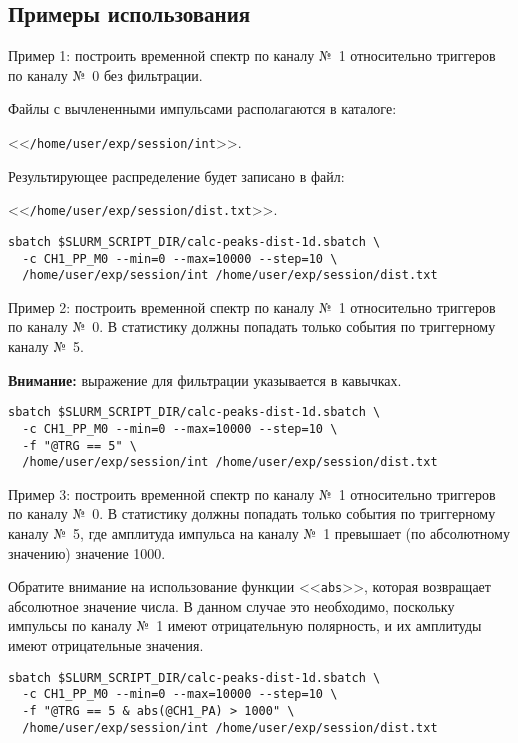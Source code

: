 \documentclass[12pt, a4paper, oneside, onecolumn]{book}
\newcommand{\DIRECTORY}[1]{<<{\tt #1}>>}
\newcommand{\FILE}[1]{<<{\tt #1}>>}
\newcommand{\NOTE}{{\bf Внимание:}}
\begin{document}
\subsection{Примеры использования}

Пример 1: построить временной спектр по каналу №~1 относительно триггеров по каналу №~0 без фильтрации. 

Файлы с вычлененными импульсами располагаются в каталоге:

 \DIRECTORY{/home/user/exp/session/int}. 

Результирующее распределение будет записано в файл:

 \FILE{/home/user/exp/session/dist.txt}.

\begin{lstlisting}
sbatch $SLURM_SCRIPT_DIR/calc-peaks-dist-1d.sbatch \
  -c CH1_PP_M0 --min=0 --max=10000 --step=10 \
  /home/user/exp/session/int /home/user/exp/session/dist.txt
\end{lstlisting}

\bigskip
Пример 2: построить временной спектр по каналу №~1 относительно триггеров по каналу №~0. В статистику должны попадать только события по триггерному каналу №~5.

\NOTE{} выражение для фильтрации указывается в кавычках.

\begin{lstlisting}
sbatch $SLURM_SCRIPT_DIR/calc-peaks-dist-1d.sbatch \
  -c CH1_PP_M0 --min=0 --max=10000 --step=10 \
  -f "@TRG == 5" \
  /home/user/exp/session/int /home/user/exp/session/dist.txt
\end{lstlisting}

\bigskip
Пример 3: построить временной спектр по каналу №~1 относительно триггеров по каналу №~0. В статистику должны попадать только события по триггерному каналу №~5, где амплитуда импульса на каналу №~1 превышает (по абсолютному значению) значение 1000.

Обратите внимание на использование функции \FILE{abs}, которая возвращает абсолютное значение числа. В данном случае это необходимо, поскольку импульсы по каналу №~1 имеют отрицательную полярность, и их амплитуды имеют отрицательные значения.

\begin{lstlisting}
sbatch $SLURM_SCRIPT_DIR/calc-peaks-dist-1d.sbatch \
  -c CH1_PP_M0 --min=0 --max=10000 --step=10 \
  -f "@TRG == 5 & abs(@CH1_PA) > 1000" \
  /home/user/exp/session/int /home/user/exp/session/dist.txt
\end{lstlisting}
\end{document}
